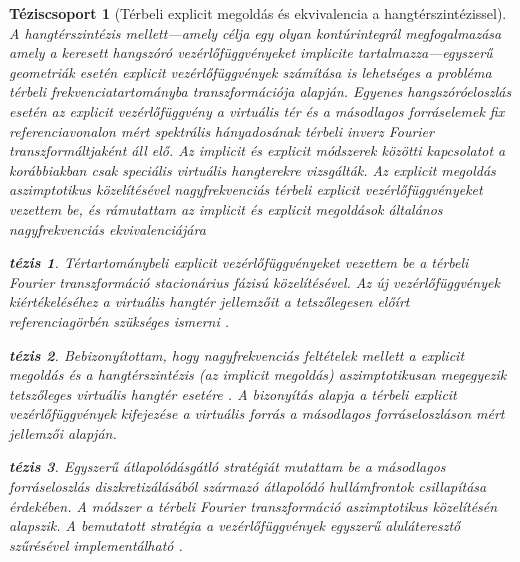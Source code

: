 \documentclass[10pt,twoside]{article}
\theoremstyle{thesisgroupstyle}
\newtheorem{thesisgroup}{Téziscsoport}
\theoremstyle{indented}
\newtheorem{thesis}{tézis}[thesisgroup]
\begin{document}
\begin{thesisgroup}[Térbeli explicit megoldás és ekvivalencia a hangtérszintézissel]
A hangtérszintézis mellett---amely célja egy olyan kontúrintegrál megfogalmazása amely a keresett hangszóró vezérlőfüggvényeket implicite tartalmazza---egyszerű geometriák esetén explicit vezérlőfüggvények számítása is lehetséges a probléma térbeli frekvenciatartományba transzformációja alapján.
Egyenes hangszóróeloszlás esetén az explicit vezérlőfüggvény a virtuális tér és a másodlagos forráselemek fix referenciavonalon mért spektrális hányadosának térbeli inverz Fourier transzformáltjaként áll elő.
Az implicit és explicit módszerek közötti kapcsolatot a korábbiakban csak speciális virtuális hangterekre vizsgálták.
Az explicit megoldás aszimptotikus közelítésével nagyfrekvenciás térbeli explicit vezérlőfüggvényeket vezettem be, és rámutattam az implicit és explicit megoldások általános nagyfrekvenciás ekvivalenciájára \cite{Firtha2017:daga_booklet, Firtha2018:WFS_vs_SDM_booklet}
\begin{thesis}
Tértartománybeli explicit vezérlőfüggvényeket vezettem be a térbeli Fourier transzformáció stacionárius fázisú közelítésével.
Az új vezérlőfüggvények kiértékeléséhez a virtuális hangtér jellemzőit a tetszőlegesen előírt referenciagörbén szükséges ismerni \cite{Firtha2017:daga_booklet}.\end{thesis}
\begin{thesis}
Bebizonyítottam, hogy nagyfrekvenciás feltételek mellett a explicit megoldás és a hangtérszintézis (az implicit megoldás) aszimptotikusan megegyezik tetszőleges virtuális hangtér esetére \cite{Firtha2018:WFS_vs_SDM_booklet}.
A bizonyítás alapja a térbeli explicit vezérlőfüggvények kifejezése a virtuális forrás a másodlagos forráseloszláson mért jellemzői alapján.
\end{thesis}
\begin{thesis}
Egyszerű átlapolódásgátló stratégiát mutattam be a másodlagos forráseloszlás diszkretizálásából származó átlapolódó hullámfrontok csillapítása érdekében.
A módszer a térbeli Fourier transzformáció aszimptotikus közelítésén alapszik.
A bemutatott stratégia a vezérlőfüggvények egyszerű aluláteresztő szűrésével implementálható \cite{Firtha2018_daga_a_booklet}.
\end{thesis}
\end{thesisgroup}
\end{document}
